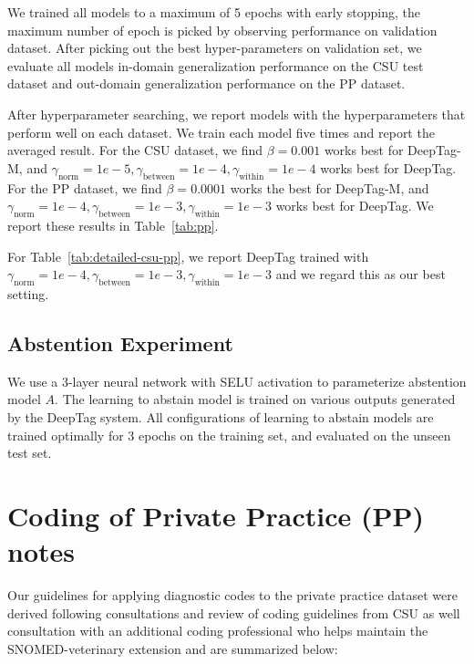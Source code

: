 \documentclass{article}[11pt,oneside]
\begin{document}
We trained all models to a maximum of 5 epochs with early stopping, the maximum number of epoch is picked by observing performance on validation dataset. After picking out the best hyper-parameters on validation set,  we evaluate all models in-domain generalization performance on the CSU test dataset and out-domain generalization performance on the PP dataset.

After hyperparameter searching, we report models with the hyperparameters that perform well on each dataset. We train each model five times and report the averaged result.
For the CSU dataset, we find $\beta=0.001$ works best for DeepTag-M, and $\gamma_\text{norm}=1e-5, \gamma_\text{between}=1e-4, \gamma_\text{within}=1e-4$ works best for DeepTag.
For the PP dataset, we find $\beta=0.0001$ works the best for DeepTag-M, and $\gamma_\text{norm}=1e-4, \gamma_\text{between}=1e-3, \gamma_\text{within}=1e-3$ works best for DeepTag. We report these results in Table~\ref{tab:pp}.

For Table~\ref{tab:detailed-csu-pp}, we report DeepTag trained with  $\gamma_\text{norm}=1e-4, \gamma_\text{between}=1e-3, \gamma_\text{within}=1e-3$ and we regard this as our best setting.

\subsection{Abstention Experiment}

We use a 3-layer neural network with SELU activation \cite{klambauer2017self} to parameterize abstention model $A$. The learning to abstain model is trained on various outputs generated by the DeepTag system. All configurations of learning to abstain models are trained optimally for 3 epochs on the training set, and evaluated on the unseen test set.

\section{Coding of Private Practice (PP) notes}

Our guidelines for applying diagnostic codes to the private practice dataset were derived following consultations and review of coding guidelines from CSU as well consultation with an additional coding professional who helps maintain the SNOMED-veterinary extension and are summarized below:
\end{document}
